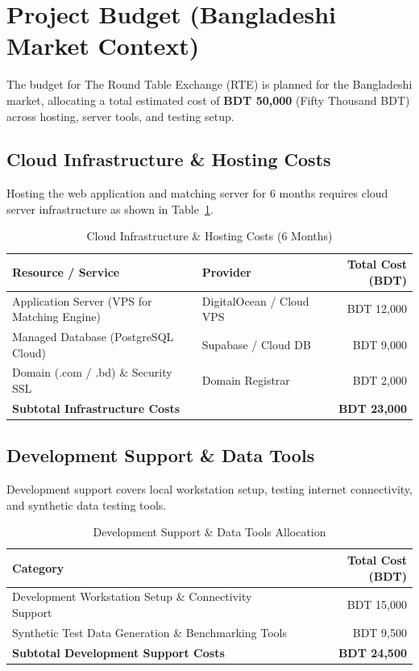 \section{Project Budget (Bangladeshi Market Context)}

The budget for The Round Table Exchange (RTE) is planned for the Bangladeshi market, allocating a total estimated cost of \textbf{BDT 50,000} (Fifty Thousand BDT) across hosting, server tools, and testing setup.

\subsection{Cloud Infrastructure \& Hosting Costs}

Hosting the web application and matching server for 6 months requires cloud server infrastructure as shown in Table~\ref{tab:infrastructure-budget}.

\begin{table}[h!]
\caption{Cloud Infrastructure \& Hosting Costs (6 Months)}
\label{tab:infrastructure-budget}
\vspace{6pt}
\centering
\begin{tabularx}{\textwidth}{|X|l|r|}
\hline
\textbf{Resource / Service} & \textbf{Provider} & \textbf{Total Cost (BDT)} \\
\hline
Application Server (VPS for Matching Engine) & DigitalOcean / Cloud VPS & BDT 12,000 \\
Managed Database (PostgreSQL Cloud) & Supabase / Cloud DB & BDT 9,000 \\
Domain (.com / .bd) \& Security SSL & Domain Registrar & BDT 2,000 \\
\hline
\multicolumn{2}{|l|}{\textbf{Subtotal Infrastructure Costs}} & \textbf{BDT 23,000} \\
\hline
\end{tabularx}
\end{table}

\subsection{Development Support \& Data Tools}

Development support covers local workstation setup, testing internet connectivity, and synthetic data testing tools.

\begin{table}[h!]
\caption{Development Support \& Data Tools Allocation}
\label{tab:dev-support-budget}
\vspace{6pt}
\centering
\begin{tabularx}{\textwidth}{|X|r|}
\hline
\textbf{Category} & \textbf{Total Cost (BDT)} \\
\hline
Development Workstation Setup \& Connectivity Support & BDT 15,000 \\
Synthetic Test Data Generation \& Benchmarking Tools & BDT 9,500 \\
\hline
\textbf{Subtotal Development Support Costs} & \textbf{BDT 24,500} \\
\hline
\end{tabularx}
\end{table}

